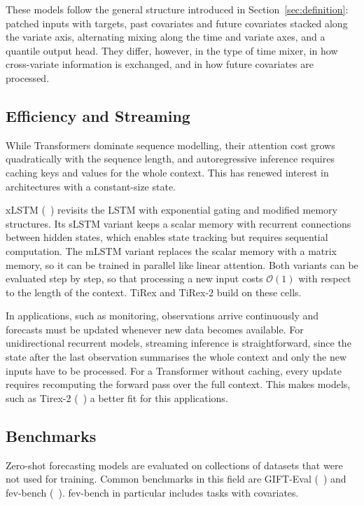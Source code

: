 These models follow the general structure introduced in Section~\ref{sec:definition}: patched inputs with targets, past covariates and future covariates stacked along the variate axis, alternating mixing along the time and variate axes, and a quantile output head. They differ, however, in the type of time mixer, in how cross-variate information is exchanged, and in how future covariates are processed.


\subsection{Efficiency and Streaming}
\label{sec:rw_recurrent}

While Transformers dominate sequence modelling, their attention cost grows quadratically with the sequence length, and autoregressive inference requires caching keys and values for the whole context. This has renewed interest in architectures with a constant-size state. 

xLSTM (\citeauthor{xlstm}~\cite{xlstm}) revisits the LSTM with exponential gating and modified memory structures. Its sLSTM variant keeps a scalar memory with recurrent connections between hidden states, which enables state tracking but requires sequential computation. The mLSTM variant replaces the scalar memory with a matrix memory, so it can be trained in parallel like linear attention. Both variants can be evaluated step by step, so that processing a new input costs $\mathcal{O}(1)$ with respect to the length of the context. TiRex and TiRex-2 build on these cells.

In applications, such as monitoring, observations arrive continuously and forecasts must be updated whenever new data becomes available. For unidirectional recurrent models, streaming inference is straightforward, since the state after the last observation summarises the whole context and only the new inputs have to be processed. For a Transformer without caching, every update requires recomputing the forward pass over the full context. This makes models, such as Tirex-2 (\citeauthor{tirex2}~\cite{tirex2}) a better fit for this applications. 


\subsection{Benchmarks}
\label{sec:rw_benchmarks}

Zero-shot forecasting models are evaluated on collections of datasets that were not used for training. Common benchmarks in this field are GIFT-Eval (\citeauthor{gifteval}~\cite{gifteval}) and fev-bench (\citeauthor{fevbench}~\cite{fevbench}). fev-bench in particular includes tasks with covariates.

